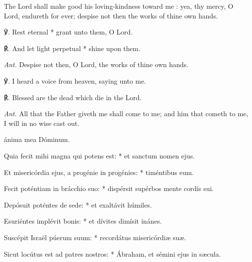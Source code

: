 The Lord shall make good his loving-kindness toward me : yea, thy mercy, O Lord, endureth for ever; despise not then the works of thine own hands.
\par
℣. Rest eternal * grant unto them, O Lord.\par
℟. And let light perpetual * shine upon them.\par\noindent
\textit{Ant.} Despise not then, O Lord, the works of thine own hands.\par
\vspace{0.5\baselineskip}
℣. I heard a voice from heaven, saying unto me.\par 
℟. Blessed are the dead which die in the Lord.\par
\noindent
\textit{Ant.} All that the Father {\dag} giveth me shall come to me; and him that cometh to me, I will in no wise cast out.
\par
{}
{ {} ánima mea Dóminum.\par
{}
Quia fecit mihi magna qui potens est: * et sanctum nomen ejus.\par
Et misericórdia ejus, a progénie in progénies: * timéntibus eum.\par
Fecit poténtiam in brácchio suo: * dispérsit supérbos mente cordis sui.\par
Depósuit poténtes de sede: * et exaltávit húmiles.\par
Esuriéntes implévit bonis: * et dívites dimísit inánes.\par
Suscépit Israël púerum suum: * recordátus misericórdi{\ae} su{\ae}.\par
Sicut locútus est ad patres nostros: * Ábraham, et sémini ejus in s{\ae}cula.}
